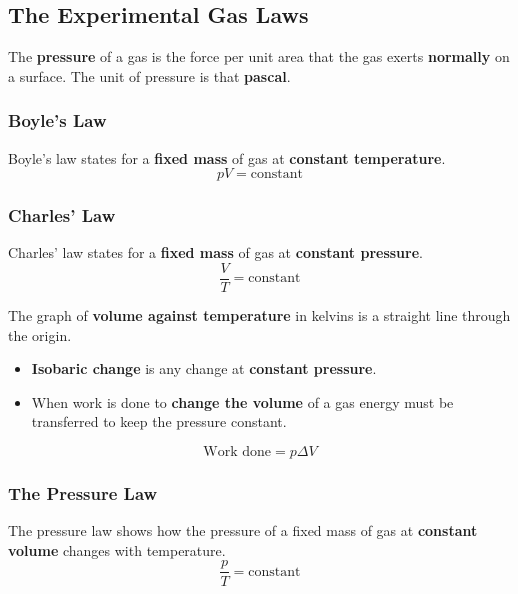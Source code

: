 \subsection{The Experimental Gas Laws}

The \textbf{pressure} of a gas is the force per unit area that the gas exerts \textbf{normally} on a surface. The unit of pressure is that \textbf{pascal}.

\subsubsection*{Boyle's Law}

Boyle's law states for a \textbf{fixed mass} of gas at \textbf{constant temperature}.
$$pV=\text{constant}$$

\subsubsection*{Charles' Law}

Charles' law states for a \textbf{fixed mass} of gas at \textbf{constant pressure}.
$$\frac{V}{T}=\text{constant}$$

The graph of \textbf{volume against temperature} in kelvins is a straight line through the origin.

\begin{itemize}
    \item \textbf{Isobaric change} is any change at \textbf{constant pressure}.
    \item When work is done to \textbf{change the volume} of a gas energy must be transferred to keep the pressure constant.
\end{itemize}
$$\text{Work done}=p\Delta V$$

\subsubsection*{The Pressure Law}

The pressure law shows how the pressure of a fixed mass of gas at \textbf{constant volume} changes with temperature.
$$\frac{p}{T}=\text{constant}$$
